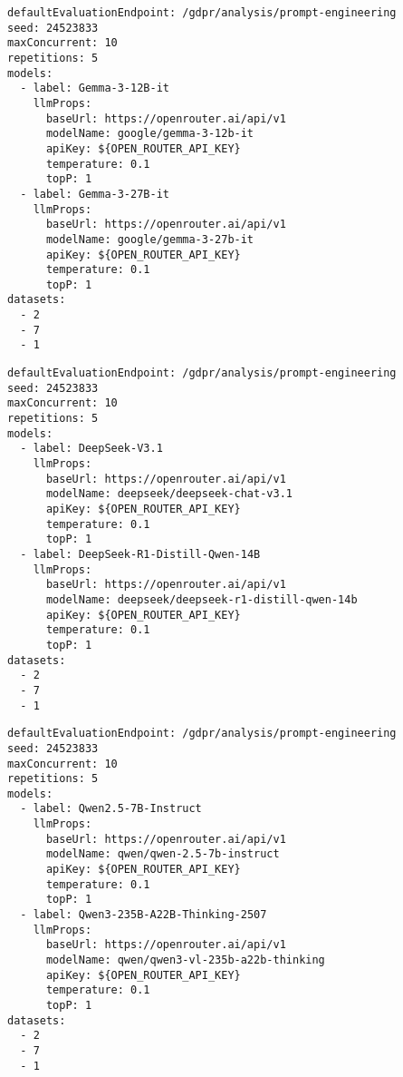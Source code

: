 \begin{lstlisting}[caption={Konfigurationsdatei vom Experiment mit Gemma Modellen}, label={lst:gemma-experiment-config}]
defaultEvaluationEndpoint: /gdpr/analysis/prompt-engineering
seed: 24523833
maxConcurrent: 10
repetitions: 5
models:
  - label: Gemma-3-12B-it
    llmProps:
      baseUrl: https://openrouter.ai/api/v1
      modelName: google/gemma-3-12b-it
      apiKey: ${OPEN_ROUTER_API_KEY}
      temperature: 0.1
      topP: 1
  - label: Gemma-3-27B-it
    llmProps:
      baseUrl: https://openrouter.ai/api/v1
      modelName: google/gemma-3-27b-it
      apiKey: ${OPEN_ROUTER_API_KEY}
      temperature: 0.1
      topP: 1
datasets:
  - 2
  - 7
  - 1
\end{lstlisting}

\begin{lstlisting}[caption={Konfigurationsdatei vom Experiment mit DeepSeek Modellen}, label={lst:deepseek-experiment-config}]
defaultEvaluationEndpoint: /gdpr/analysis/prompt-engineering
seed: 24523833
maxConcurrent: 10
repetitions: 5
models:
  - label: DeepSeek-V3.1
    llmProps:
      baseUrl: https://openrouter.ai/api/v1
      modelName: deepseek/deepseek-chat-v3.1
      apiKey: ${OPEN_ROUTER_API_KEY}
      temperature: 0.1
      topP: 1
  - label: DeepSeek-R1-Distill-Qwen-14B
    llmProps:
      baseUrl: https://openrouter.ai/api/v1
      modelName: deepseek/deepseek-r1-distill-qwen-14b
      apiKey: ${OPEN_ROUTER_API_KEY}
      temperature: 0.1
      topP: 1
datasets:
  - 2
  - 7
  - 1
\end{lstlisting}

\begin{lstlisting}[caption={Konfigurationsdatei vom Experiment mit Qwen Modellen}, label={lst:qwen-experiment-config}]
defaultEvaluationEndpoint: /gdpr/analysis/prompt-engineering
seed: 24523833
maxConcurrent: 10
repetitions: 5
models:
  - label: Qwen2.5-7B-Instruct
    llmProps:
      baseUrl: https://openrouter.ai/api/v1
      modelName: qwen/qwen-2.5-7b-instruct
      apiKey: ${OPEN_ROUTER_API_KEY}
      temperature: 0.1
      topP: 1
  - label: Qwen3-235B-A22B-Thinking-2507
    llmProps:
      baseUrl: https://openrouter.ai/api/v1
      modelName: qwen/qwen3-vl-235b-a22b-thinking
      apiKey: ${OPEN_ROUTER_API_KEY}
      temperature: 0.1
      topP: 1
datasets:
  - 2
  - 7
  - 1
\end{lstlisting}


